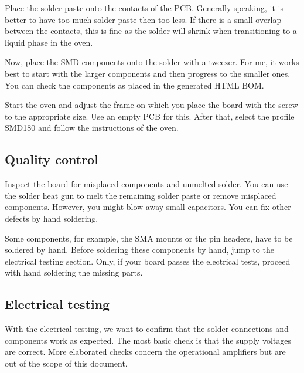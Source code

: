 Place the solder paste onto the contacts of the PCB. Generally speaking, it is better to have too much solder paste then too less. If there is a small overlap between the contacts, this is fine as the solder will shrink when transitioning to a liquid phase in the oven.

Now, place the SMD components onto the solder with a tweezer. For me, it works best to start with the larger components and then progress to the smaller ones. You can check the components as placed in the generated HTML BOM.


Start the oven and adjust the frame on which you place the board with the screw to the appropriate size. Use an empty PCB for this.
After that, select the profile SMD180 and follow the instructions of the oven.

\subsection{Quality control}

Inspect the board for misplaced components and unmelted solder. You can use the solder heat gun to melt the remaining solder paste or remove misplaced components. However, you might blow away small capacitors.
You can fix other defects by hand soldering.


Some components, for example, the SMA mounts or the pin headers, have to be soldered by hand. Before soldering these components by hand, jump to the electrical testing section. Only, if your board passes the electrical tests, proceed with hand soldering the missing parts.

\subsection{Electrical testing}

With the electrical testing, we want to confirm that the solder connections and components work as expected.
The most basic check is that the supply voltages are correct.
More elaborated checks concern the operational amplifiers but are out of the scope of this document.

